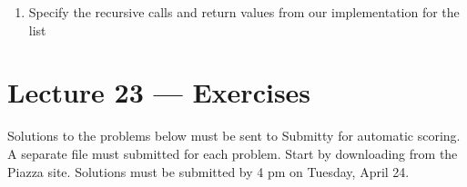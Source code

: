 \documentclass[letterpaper,10pt,english]{sphinxmanual}
\begin{document}
\begin{enumerate}
\item {} 
Specify the recursive calls and return values from our 
implementation for the list

%
\begin{sphinxVerbatim}[commandchars=\\\{\}]
  \PYG{p}{[}        \PYG{p}{]}
\end{sphinxVerbatim}

\end{enumerate}


\chapter{Lecture 23 — Exercises}
\label{\detokenize{lecture_notes/lec23_recursion_exercises/exercises:lecture-23-exercises}}\label{\detokenize{lecture_notes/lec23_recursion_exercises/exercises::doc}}
Solutions to the problems below must be sent to Submitty for automatic
scoring.  A separate file must submitted for each problem.  Start by
downloading  from the Piazza site.  Solutions
must be submitted by 4 pm on Tuesday, April 24.
\end{document}
